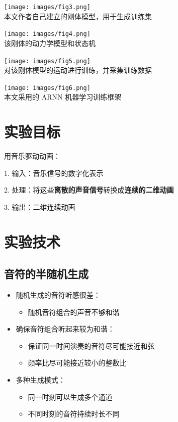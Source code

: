 \documentclass[a4paper, 12pt]{article}
\begin{document}
\begin{center}
\texttt{[image: images/fig3.png]}\\
本文作者自己建立的刚体模型，用于生成训练集
\end{center}

\begin{center}
\texttt{[image: images/fig4.png]}\\
该刚体的动力学模型和状态机
\end{center}

\begin{center}
\texttt{[image: images/fig5.png]}\\
对该刚体模型的运动进行训练，并采集训练数据
\end{center}

\begin{center}
\texttt{[image: images/fig6.png]}\\
本文采用的 ARNN 机器学习训练框架
\end{center}

\section{实验目标}

用音乐驱动动画：

1. 输入：音乐信号的数字化表示

2. 处理：将这些\textbf{离散的声音信号}转换成\textbf{连续的二维动画}

3. 输出：二维连续动画


\section{实验技术}

\subsection{音符的半随机生成}

\begin{itemize}[leftmargin=*]
\item 随机生成的音符听感很差：
    \begin{itemize}[leftmargin=*]
    \item 随机音符组合的声音不够和谐
    \end{itemize}
\item 确保音符组合听起来较为和谐：
    \begin{itemize}[leftmargin=*]
    \item 保证同一时间演奏的音符尽可能接近和弦
    \item 频率比尽可能接近较小的整数比
    \end{itemize}
\item 多种生成模式：
    \begin{itemize}[leftmargin=*]
    \item 同一时刻可以生成多个通道
    \item 不同时刻的音符持续时长不同
    \end{itemize}
\end{itemize}
\end{document}
